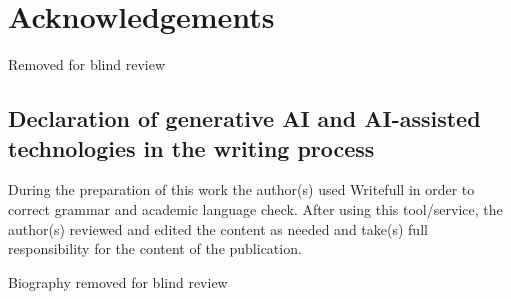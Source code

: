 \documentclass[a4paper,fleqn]{cas-sc}
\begin{document}


\section*{Acknowledgements}
Removed for blind review

\subsection{Declaration of generative AI and AI-assisted technologies in the writing process}

During the preparation of this work the author(s) used Writefull in order to correct grammar and academic language check. After using this tool/service, the author(s) reviewed and edited the content as needed and take(s) full responsibility for the content of the publication.


\printcredits

%

%



\bio{}
Biography removed for blind review
\endbio
\end{document}
